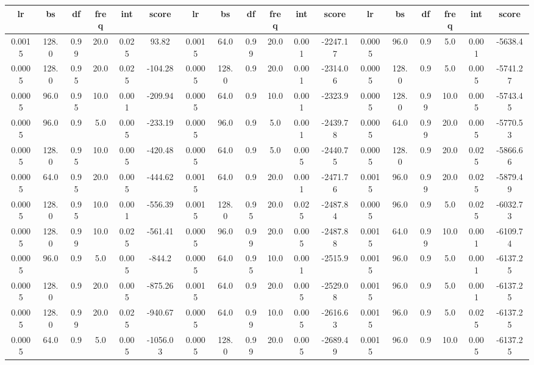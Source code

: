\begin{table}[h]
    \centering
    \begin{tabular}{|c|c|c|c|c|c||c|c|c|c|c|c||c|c|c|c|c|c|}
    \hline
    lr & bs & df & freq & int & score & lr & bs & df & freq & int & score & lr & bs & df & freq & int & score \\
    \hline
    0.0015 & 128.0 & 0.99 & 20.0 & 0.025 & 93.82 & 0.0015 & 64.0 & 0.99 & 20.0 & 0.001 & -2247.17 & 0.0005 & 96.0 & 0.9 & 5.0 & 0.001 & -5638.4 \\
    \hline
    0.0005 & 128.0 & 0.95 & 20.0 & 0.025 & -104.28 & 0.0005 & 128.0 & 0.9 & 20.0 & 0.001 & -2314.06 & 0.0005 & 128.0 & 0.9 & 5.0 & 0.005 & -5741.27 \\
    \hline
    0.0005 & 96.0 & 0.95 & 10.0 & 0.001 & -209.94 & 0.0005 & 64.0 & 0.9 & 10.0 & 0.001 & -2323.9 & 0.0005 & 128.0 & 0.99 & 10.0 & 0.005 & -5743.45 \\
    \hline
    0.0005 & 96.0 & 0.9 & 5.0 & 0.005 & -233.19 & 0.0005 & 96.0 & 0.9 & 5.0 & 0.001 & -2439.78 & 0.0005 & 64.0 & 0.99 & 20.0 & 0.005 & -5770.53 \\
    \hline
    0.0005 & 128.0 & 0.95 & 10.0 & 0.005 & -420.48 & 0.0005 & 64.0 & 0.9 & 5.0 & 0.005 & -2440.75 & 0.0005 & 128.0 & 0.9 & 20.0 & 0.025 & -5866.66 \\
    \hline
    0.0005 & 64.0 & 0.95 & 20.0 & 0.005 & -444.62 & 0.0015 & 64.0 & 0.9 & 20.0 & 0.001 & -2471.76 & 0.0015 & 96.0 & 0.99 & 20.0 & 0.025 & -5879.49 \\
    \hline
    0.0005 & 128.0 & 0.95 & 10.0 & 0.001 & -556.39 & 0.0015 & 128.0 & 0.95 & 20.0 & 0.025 & -2487.84 & 0.0005 & 96.0 & 0.9 & 5.0 & 0.025 & -6032.73 \\
    \hline
    0.0005 & 128.0 & 0.99 & 10.0 & 0.025 & -561.41 & 0.0005 & 96.0 & 0.99 & 20.0 & 0.005 & -2487.88 & 0.0015 & 64.0 & 0.99 & 10.0 & 0.001 & -6109.74 \\
    \hline
    0.0005 & 96.0 & 0.9 & 5.0 & 0.005 & -844.2 & 0.0005 & 64.0 & 0.95 & 10.0 & 0.001 & -2515.9 & 0.0015 & 96.0 & 0.9 & 5.0 & 0.001 & -6137.25 \\
    \hline
    0.0005 & 128.0 & 0.9 & 20.0 & 0.005 & -875.26 & 0.0015 & 64.0 & 0.9 & 20.0 & 0.005 & -2529.08 & 0.0015 & 96.0 & 0.9 & 5.0 & 0.001 & -6137.25 \\
    \hline
    0.0005 & 128.0 & 0.99 & 20.0 & 0.025 & -940.67 & 0.0005 & 64.0 & 0.99 & 10.0 & 0.005 & -2616.63 & 0.0015 & 96.0 & 0.9 & 5.0 & 0.025 & -6137.25 \\
    \hline
    0.0005 & 64.0 & 0.9 & 5.0 & 0.005 & -1056.03 & 0.0005 & 128.0 & 0.99 & 20.0 & 0.005 & -2689.49 & 0.0015 & 96.0 & 0.9 & 10.0 & 0.005 & -6137.25 \\

\end{tabular}
\end{table}
